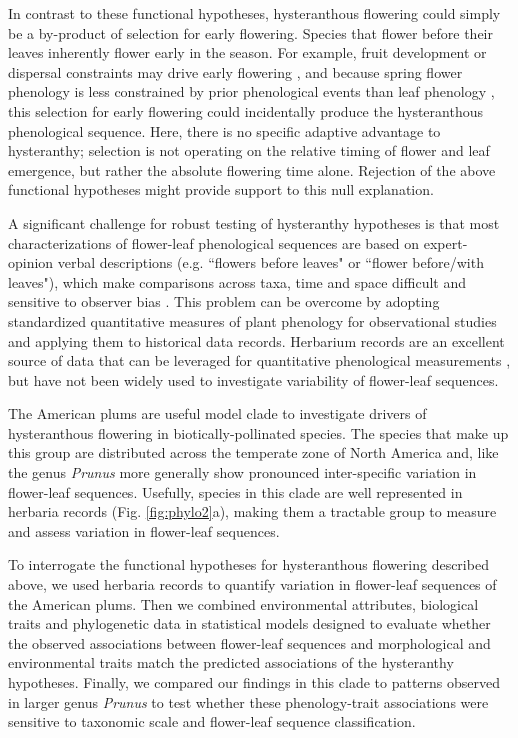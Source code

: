 \documentclass{article}[12pt]
\begin{document}
In contrast to these functional hypotheses, hysteranthous flowering could simply be a by-product of selection for early flowering. Species that flower before their leaves inherently flower early in the season. For example, fruit development or dispersal constraints may drive early flowering \citep{Primack1987}, and because spring flower phenology is less constrained by prior phenological events than leaf phenology \citep{Ettinger2018,Savage2019}, this selection for early flowering could incidentally produce the hysteranthous phenological sequence. Here, there is no specific adaptive advantage to hysteranthy;  selection is not operating on the relative timing of flower and leaf emergence, but rather the absolute flowering time alone. Rejection of the above functional hypotheses might provide support to this null explanation. 

\noindent A significant challenge for robust testing of hysteranthy hypotheses is that most characterizations of flower-leaf phenological sequences are based on expert-opinion verbal descriptions (e.g. ``flowers before leaves" or ``flower before/with leaves"), which make comparisons across taxa, time and space difficult and sensitive to observer bias  \citep[see][]{Buonaiuto2020}. This problem can be overcome by adopting standardized quantitative measures of plant phenology for observational studies and applying them to historical data records. Herbarium records are an excellent source of data that can be leveraged for quantitative phenological measurements \citep{Willis2017}, but have not been widely used to investigate variability of flower-leaf sequences.

\noindent The American plums %
are useful model clade to investigate drivers of hysteranthous flowering in biotically-pollinated species. The species that make up this group are distributed across the temperate zone of North America and, like the genus \textit{Prunus} more generally show pronounced inter-specific variation in flower-leaf sequences. Usefully, species in this clade are well represented in herbaria records (Fig. \ref{fig:phylo2}a), making them a tractable group to measure and assess variation in flower-leaf sequences.

\noindent To interrogate the functional hypotheses for hysteranthous flowering described above, we used herbaria records to quantify variation in flower-leaf sequences of the American plums. Then we combined environmental attributes, biological traits and phylogenetic data in statistical models designed to evaluate whether the observed associations between flower-leaf sequences and morphological and environmental traits match the predicted associations of the hysteranthy hypotheses. Finally, we compared our findings in this clade to patterns observed in larger genus \emph{Prunus} to test whether these phenology-trait associations were sensitive to taxonomic scale and flower-leaf sequence classification.
\end{document}
